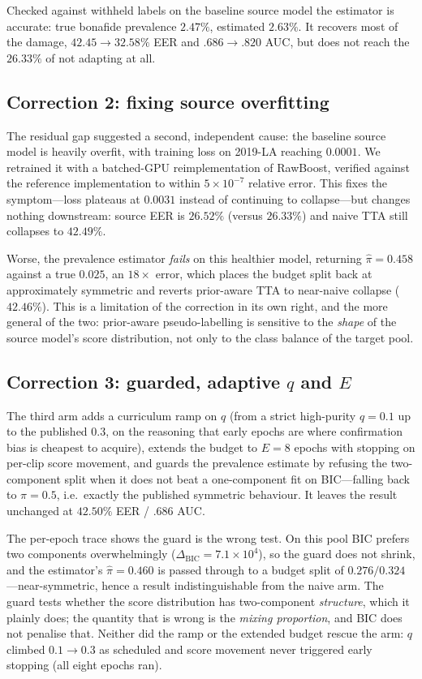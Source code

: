 \documentclass[conference]{IEEEtran}
\begin{document}
Checked against withheld labels on the baseline source model the estimator is
accurate: true bonafide prevalence $2.47\%$, estimated $2.63\%$. It recovers
most of the damage, $42.45\!\to\!32.58\%$ EER and $.686\!\to\!.820$ AUC, but
does not reach the $26.33\%$ of not adapting at all.

\subsection{Correction 2: fixing source overfitting}
The residual gap suggested a second, independent cause: the baseline source
model is heavily overfit, with training loss on 2019-LA reaching $0.0001$. We
retrained it with a batched-GPU reimplementation of RawBoost, verified against
the reference implementation to within $5\times10^{-7}$ relative error. This
fixes the symptom---loss plateaus at $0.0031$ instead of continuing to
collapse---but changes nothing downstream: source EER is $26.52\%$ (versus
$26.33\%$) and naive TTA still collapses to $42.49\%$.

Worse, the prevalence estimator \emph{fails} on this healthier model, returning
$\hat\pi{=}0.458$ against a true $0.025$, an $18\times$ error, which places the
budget split back at approximately symmetric and reverts prior-aware TTA to
near-naive collapse ($42.46\%$). This is a limitation of the correction in its
own right, and the more general of the two: prior-aware pseudo-labelling is
sensitive to the \emph{shape} of the source model's score distribution, not
only to the class balance of the target pool.

\subsection{Correction 3: guarded, adaptive \texorpdfstring{$q$ and $E$}{q and E}}
The third arm adds a curriculum ramp on $q$ (from a strict high-purity
$q{=}0.1$ up to the published $0.3$, on the reasoning that early epochs are
where confirmation bias is cheapest to acquire), extends the budget to $E{=}8$
epochs with stopping on per-clip score movement, and guards the prevalence
estimate by refusing the two-component split when it does not beat a
one-component fit on BIC---falling back to $\pi{=}0.5$, i.e.\ exactly the
published symmetric behaviour. It leaves the result unchanged at $42.50\%$ EER
/ $.686$ AUC.

The per-epoch trace shows the guard is the wrong test. On this pool BIC prefers
two components overwhelmingly ($\Delta_{\text{BIC}}{=}7.1\times10^{4}$), so the
guard does not shrink, and the estimator's $\hat\pi{=}0.460$ is passed through
to a budget split of $0.276/0.324$---near-symmetric, hence a result
indistinguishable from the naive arm. The guard tests whether the score
distribution has two-component \emph{structure}, which it plainly does; the
quantity that is wrong is the \emph{mixing proportion}, and BIC does not
penalise that. Neither did the ramp or the extended budget rescue the arm: $q$
climbed $0.1\!\to\!0.3$ as scheduled and score movement never triggered early
stopping (all eight epochs ran).
\end{document}
